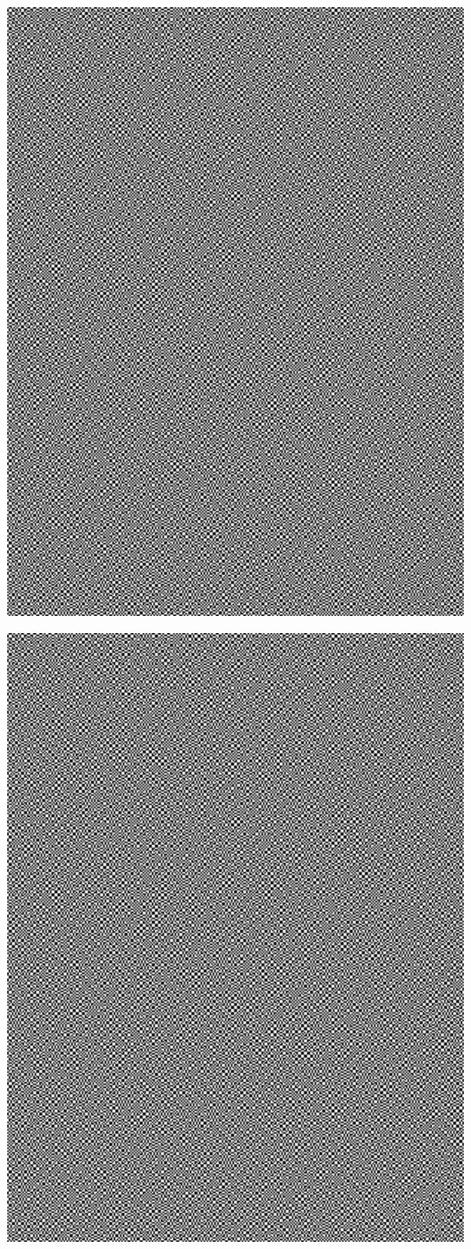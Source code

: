\documentclass[12pt]{article}
\begin{document}
\begin{center}
  \includegraphics[width=15cm]{bild-1.png}
\end{center}
\clearpage
\begin{center}
  \includegraphics[width=15cm]{bild-2.png}
\end{center}
\end{document}
